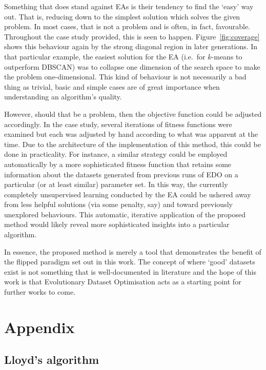 Something that does stand against EAs is their tendency to find the `easy' way
out. That is, reducing down to the simplest solution which solves the given
problem. In most cases, that is not a problem and is often, in fact, favourable.
Throughout the case study provided, this is seen to happen.
Figure~\ref{fig:coverage} shows this behaviour again by the strong diagonal
region in later generations. In that particular example, the easiest solution
for the EA (i.e.\ for \(k\)-means to outperform DBSCAN) was to collapse one
dimension of the search space to make the problem one-dimensional. This kind of
behaviour is not necessarily a bad thing as trivial, basic and simple cases are
of great importance when understanding an algorithm's quality.

However, should that be a problem, then the objective function could be adjusted
accordingly. In the case study, several iterations of fitness functions were
examined but each was adjusted by hand according to what was apparent at the
time. Due to the architecture of the implementation of this method, this could
be done in practicality. For instance, a similar strategy could be employed
automatically by a more sophisticated fitness function that retains some
information about the datasets generated from previous runs of EDO on a
particular (or at least similar) parameter set. In this way, the currently
completely unsupervised learning conducted by the EA could be ushered away from
less helpful solutions (via some penalty, say) and toward previously unexplored
behaviours. This automatic, iterative application of the proposed method would
likely reveal more sophisticated insights into a particular algorithm.

In essence, the proposed method is merely a tool that demonstrates the benefit
of the flipped paradigm set out in this work. The concept of where `good'
datasets exist is not something that is well-documented in literature and the
hope of this work is that Evolutionary Dataset Optimisation acts as a starting
point for further works to come.


\section*{Appendix}

\subsection{Lloyd's algorithm}\label{app:kmeans}

